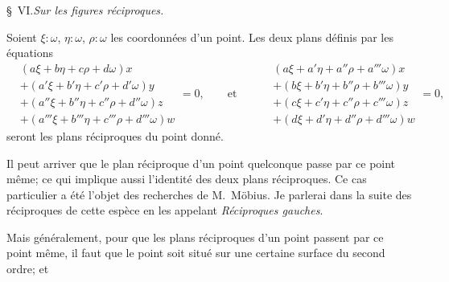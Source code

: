 \documentclass[11pt]{article}
\begin{document}
\medskip

\begin{center}\S\ VI.\quad \textit{Sur les figures r\'eciproques.}\end{center}

\medskip

Soient $\xi : \omega$, $\eta : \omega$, $\rho : \omega$ les coordonn\'ees d'un point. Les deux plans d\'efinis par
les \'equations
\[
\begin{aligned}
&(a\xi + b\eta + c\rho + d\omega)x\\
&+ (a'\xi + b'\eta + c'\rho + d'\omega)y\\
&+ (a''\xi + b''\eta + c''\rho + d''\omega)z\\
&+ (a'''\xi + b'''\eta + c'''\rho + d'''\omega)w
\end{aligned} = 0, \qquad
\text{et} \qquad
\begin{aligned}
&(a\xi + a'\eta + a''\rho + a'''\omega)x\\
&+ (b\xi + b'\eta + b''\rho + b'''\omega)y\\
&+ (c\xi + c'\eta + c''\rho + c'''\omega)z\\
&+ (d\xi + d'\eta + d''\rho + d'''\omega)w
\end{aligned} = 0,
\]
seront les plans r\'eciproques du point donn\'e.

\medskip

Il peut arriver que le plan r\'eciproque d'un point quelconque passe par ce point
m\^eme; ce qui implique aussi l'identit\'e des deux plans r\'eciproques. Ce cas particulier
a \'et\'e l'objet des recherches de M.\ M\"obius. Je parlerai dans la suite des r\'eciproques
de cette esp\`ece en les appelant \textit{R\'eciproques gauches}.

\medskip

Mais g\'en\'eralement, pour que les plans r\'eciproques d'un point passent par ce point
m\^eme, il faut que le point soit situ\'e sur une certaine surface du second ordre; et
\end{document}
